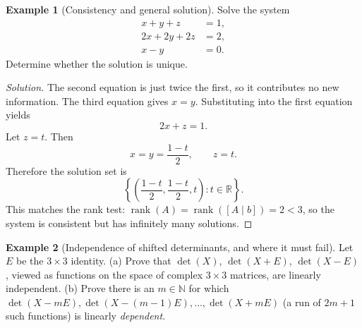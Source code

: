 \documentclass[11pt]{article}
\theoremstyle{definition}
\newtheorem{example}{Example}[section]
\newcommand{\R}{\mathbb{R}}
\newcommand{\N}{\mathbb{N}}
\newcommand{\rank}{\operatorname{rank}}
\begin{document}
\begin{example}[Consistency and general solution]
Solve the system
\[
\begin{aligned}
x+y+z&=1,\\
2x+2y+2z&=2,\\
x-y&=0.
\end{aligned}
\]
Determine whether the solution is unique.
\end{example}

\begin{proof}[Solution]
The second equation is just twice the first, so it contributes no new information. The third equation gives $x=y$. Substituting into the first equation yields
\[
2x+z=1.
\]
Let $z=t$. Then
\[
x=y=\frac{1-t}{2}, \qquad z=t.
\]
Therefore the solution set is
\[
\left\{\left(\frac{1-t}{2},\frac{1-t}{2},t\right): t\in\R\right\}.
\]
This matches the rank test: $\rank(A)=\rank([A\mid b])=2<3$, so the system is consistent but has infinitely many solutions.
\end{proof}

\begin{example}[Independence of shifted determinants, and where it must fail]
Let $E$ be the $3\times3$ identity. (a) Prove that $\det(X)$, $\det(X+E)$, $\det(X-E)$, viewed as functions on the space of complex $3\times3$ matrices, are linearly independent. (b) Prove there is an $m\in\N$ for which $\det(X-mE),\det(X-(m-1)E),\dots,\det(X+mE)$ (a run of $2m+1$ such functions) is linearly \emph{dependent}.
\end{example}
\end{document}

